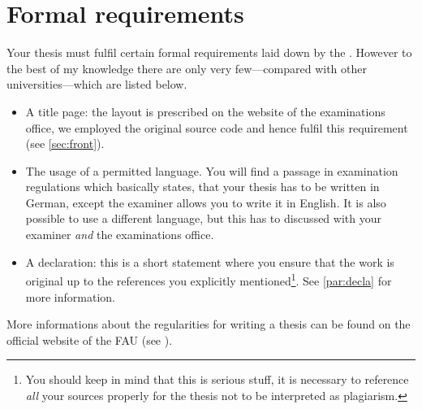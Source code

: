 \section{Formal requirements}\label{sec:reg}
Your thesis must fulfil certain formal requirements laid down by the 
. 
However to the best of my knowledge there are only very few---compared with other 
universities---which are listed below.
\begin{itemize}
\item A title page: the layout is prescribed on the website of the examinations office, we 
employed the original source code and hence fulfil this requirement (see \cref{sec:front}). 
\item The usage of a permitted language. You will find a passage in 
examination regulations which basically states, that your thesis has to be written in 
German, except the examiner allows you to write it in English. It is also possible to 
use a different language, but this has to discussed with your examiner \emph{and} 
the examinations office.
\item A declaration: this is a short statement where you ensure that the work is original 
up to the references you explicitly mentioned\footnote{You should keep in mind that this 
is serious stuff, it is necessary to reference \emph{all} your sources properly for the 
thesis not to be interpreted as plagiarism.}. See \cref{par:decla} for more information.
\end{itemize}
More informations about the regularities for writing a thesis can be found on the official 
website of the FAU (see \cite{FAUreg}).
